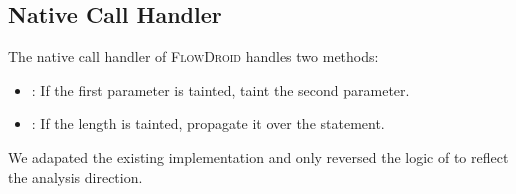 \documentclass[../draft.tex]{subfiles}
\begin{document}
    \subsection{Native Call Handler}
    The native call handler of \textsc{FlowDroid} handles two methods:
    \begin{itemize}
        \item {}: If the first parameter is tainted, taint the second parameter.
        \item {}: If the length is tainted, propagate it over the statement.
    \end{itemize}
    We adapated the existing implementation and only reversed the logic of  to reflect the analysis direction.

    
\end{document}

